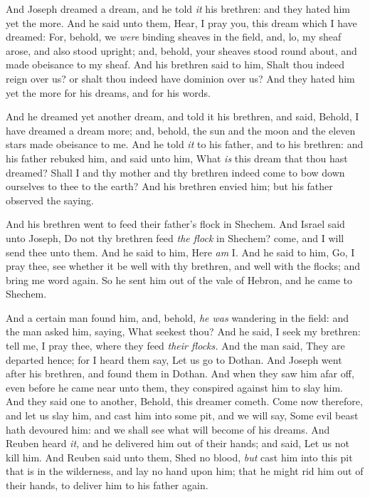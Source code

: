 \documentclass[11pt,letterpaper,oneside]{memoir}
\begin{document}
And Joseph dreamed a dream, and he told \emph{it} his brethren: and they
hated him yet the more. And he said unto them, Hear, I pray you, this
dream which I have dreamed: For, behold, we \emph{were} binding sheaves
in the field, and, lo, my sheaf arose, and also stood upright; and,
behold, your sheaves stood round about, and made obeisance to my sheaf.
And his brethren said to him, Shalt thou indeed reign over us? or shalt
thou indeed have dominion over us? And they hated him yet the more for
his dreams, and for his words.

And he dreamed yet another dream, and told it his brethren, and said,
Behold, I have dreamed a dream more; and, behold, the sun and the moon
and the eleven stars made obeisance to me. And he told \emph{it} to his
father, and to his brethren: and his father rebuked him, and said unto
him, What \emph{is} this dream that thou hast dreamed? Shall I and thy
mother and thy brethren indeed come to bow down ourselves to thee to the
earth? And his brethren envied him; but his father observed the saying.

And his brethren went to feed their father's flock in Shechem. And
Israel said unto Joseph, Do not thy brethren feed \emph{the flock} in
Shechem? come, and I will send thee unto them. And he said to him, Here
\emph{am} I. And he said to him, Go, I pray thee, see whether it be well
with thy brethren, and well with the flocks; and bring me word again. So
he sent him out of the vale of Hebron, and he came to Shechem.

And a certain man found him, and, behold, \emph{he was} wandering in the
field: and the man asked him, saying, What seekest thou? And he said, I
seek my brethren: tell me, I pray thee, where they feed \emph{their
flocks. }And the man said, They are departed hence; for I heard them
say, Let us go to Dothan. And Joseph went after his brethren, and found
them in Dothan. And when they saw him afar off, even before he came near
unto them, they conspired against him to slay him. And they said one to
another, Behold, this dreamer cometh. Come now therefore, and let us
slay him, and cast him into some pit, and we will say, Some evil beast
hath devoured him: and we shall see what will become of his dreams. And
Reuben heard \emph{it,} and he delivered him out of their hands; and
said, Let us not kill him. And Reuben said unto them, Shed no blood,
\emph{but} cast him into this pit that is in the wilderness, and lay no
hand upon him; that he might rid him out of their hands, to deliver him
to his father again.
\end{document}
